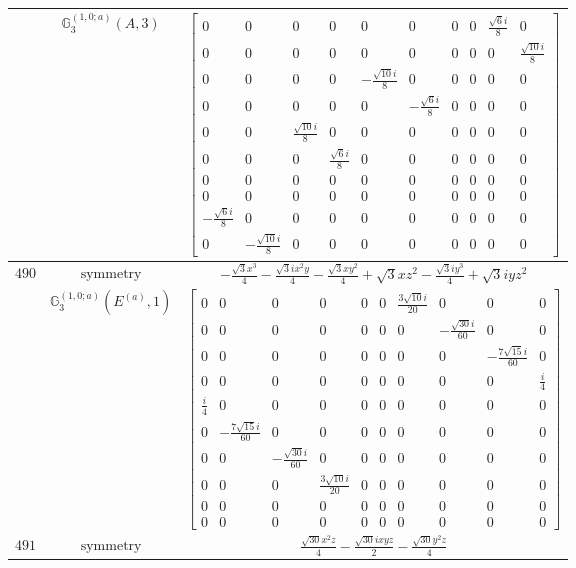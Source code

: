 \documentclass[fleqn,8pt,landscape]{jsarticle}
\begin{document}
\begin{longtable}{ccc}
$  $ & $ \mathbb{G}_{3}^{(1,0;a)}(A,3) $ & $ \begin{bmatrix} 0 & 0 & 0 & 0 & 0 & 0 & 0 & 0 & \frac{\sqrt{6} i}{8} & 0 \\ 0 & 0 & 0 & 0 & 0 & 0 & 0 & 0 & 0 & \frac{\sqrt{10} i}{8} \\ 0 & 0 & 0 & 0 & - \frac{\sqrt{10} i}{8} & 0 & 0 & 0 & 0 & 0 \\ 0 & 0 & 0 & 0 & 0 & - \frac{\sqrt{6} i}{8} & 0 & 0 & 0 & 0 \\ 0 & 0 & \frac{\sqrt{10} i}{8} & 0 & 0 & 0 & 0 & 0 & 0 & 0 \\ 0 & 0 & 0 & \frac{\sqrt{6} i}{8} & 0 & 0 & 0 & 0 & 0 & 0 \\ 0 & 0 & 0 & 0 & 0 & 0 & 0 & 0 & 0 & 0 \\ 0 & 0 & 0 & 0 & 0 & 0 & 0 & 0 & 0 & 0 \\ - \frac{\sqrt{6} i}{8} & 0 & 0 & 0 & 0 & 0 & 0 & 0 & 0 & 0 \\ 0 & - \frac{\sqrt{10} i}{8} & 0 & 0 & 0 & 0 & 0 & 0 & 0 & 0 \end{bmatrix} $ \\ \hline
$ 490 $ & $ \text{symmetry} $ & $ - \frac{\sqrt{3} x^{3}}{4} - \frac{\sqrt{3} i x^{2} y}{4} - \frac{\sqrt{3} x y^{2}}{4} + \sqrt{3} x z^{2} - \frac{\sqrt{3} i y^{3}}{4} + \sqrt{3} i y z^{2} $ \\
$  $ & $ \mathbb{G}_{3}^{(1,0;a)}(E^{(a)},1) $ & $ \begin{bmatrix} 0 & 0 & 0 & 0 & 0 & 0 & \frac{3 \sqrt{10} i}{20} & 0 & 0 & 0 \\ 0 & 0 & 0 & 0 & 0 & 0 & 0 & - \frac{\sqrt{30} i}{60} & 0 & 0 \\ 0 & 0 & 0 & 0 & 0 & 0 & 0 & 0 & - \frac{7 \sqrt{15} i}{60} & 0 \\ 0 & 0 & 0 & 0 & 0 & 0 & 0 & 0 & 0 & \frac{i}{4} \\ \frac{i}{4} & 0 & 0 & 0 & 0 & 0 & 0 & 0 & 0 & 0 \\ 0 & - \frac{7 \sqrt{15} i}{60} & 0 & 0 & 0 & 0 & 0 & 0 & 0 & 0 \\ 0 & 0 & - \frac{\sqrt{30} i}{60} & 0 & 0 & 0 & 0 & 0 & 0 & 0 \\ 0 & 0 & 0 & \frac{3 \sqrt{10} i}{20} & 0 & 0 & 0 & 0 & 0 & 0 \\ 0 & 0 & 0 & 0 & 0 & 0 & 0 & 0 & 0 & 0 \\ 0 & 0 & 0 & 0 & 0 & 0 & 0 & 0 & 0 & 0 \end{bmatrix} $ \\ \hline
$ 491 $ & $ \text{symmetry} $ & $ \frac{\sqrt{30} x^{2} z}{4} - \frac{\sqrt{30} i x y z}{2} - \frac{\sqrt{30} y^{2} z}{4} $ \\

\end{longtable}
\end{document}
